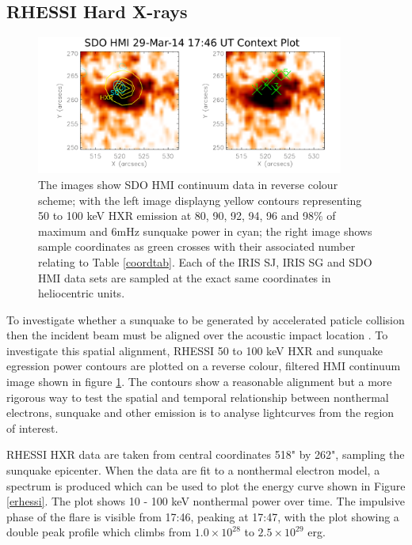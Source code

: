 \subsection{RHESSI Hard X-rays}\label{rhessiresults}
\begin{figure}[H]
  \begin{center}
  \includegraphics[width=0.9\textwidth]{29-Mar-14-HMI-Sunquake-Context-Plot}
  \end{center}
  \caption{The images show SDO HMI continuum data in reverse colour scheme; with the left image displayng yellow contours representing 50 to 100 keV HXR emission at 80, 90, 92, 94, 96 and 98$\%$ of maximum and 6mHz sunquake power in cyan; the right image shows sample coordinates as green crosses with their associated number relating to Table \ref{coordtab}. Each of the IRIS SJ, IRIS SG and SDO HMI data sets are sampled at the exact same coordinates in heliocentric units.}\label{hmicontext}
\end{figure}


To investigate whether a sunquake to be generated by accelerated paticle collision then the incident beam must be aligned over the acoustic impact location \citep{1998IAUS..185..191K}. To investigate this spatial alignment, RHESSI 50 to 100 keV HXR and sunquake egression power contours are plotted on a reverse colour, filtered HMI continuum image shown in figure \ref{hmicontext}. The contours show a reasonable alignment but a more rigorous way to test the spatial and temporal relationship between nonthermal electrons, sunquake and other emission is to analyse lightcurves from the region of interest.   %

RHESSI HXR data are taken from central coordinates 518" by 262", sampling the sunquake epicenter. When the data are fit to a nonthermal electron model, a spectrum is produced which can be used to plot the energy curve shown in Figure \ref{erhessi}. The plot shows 10 - 100 keV nonthermal power over time. The impulsive phase of the flare is visible from 17:46, peaking at 17:47, with the plot showing a double peak profile which climbs from $1.0{\times}10^{28}$ to $2.5{\times}10^{29}$ erg. 



